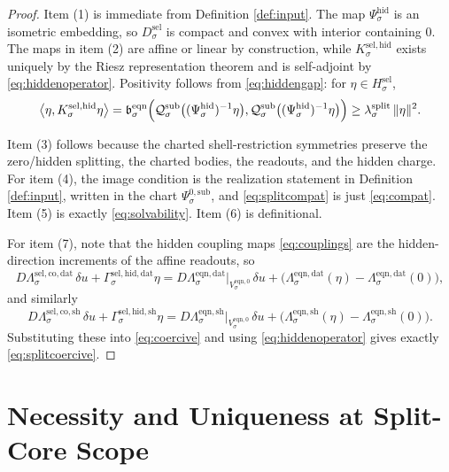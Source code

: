 \documentclass[11pt]{article}
\newcommand{\EqnZero}[1]{V_{#1}^{\mathrm{eqn},0}}
\newcommand{\EqnData}[1]{\Lambda_{#1}^{\mathrm{eqn,dat}}}
\newcommand{\EqnShell}[1]{\Lambda_{#1}^{\mathrm{eqn,sh}}}
\newcommand{\EqnPair}[1]{\mathfrak b_{#1}^{\mathrm{eqn}}}
\newcommand{\SubZeroChart}[1]{\Psi_{#1}^{0,\mathrm{sub}}}
\newcommand{\HiddenChart}[1]{\Psi_{#1}^{\mathrm{hid}}}
\newcommand{\SubCharge}[1]{\mathcal Q_{#1}^{\mathrm{sub}}}
\newcommand{\SelCoreData}[1]{\Lambda_{#1}^{\mathrm{sel,co,dat}}}
\newcommand{\SelCoreShell}[1]{\Lambda_{#1}^{\mathrm{sel,co,sh}}}
\newcommand{\GapSpace}[1]{H_{#1}^{\mathrm{sel}}}
\newcommand{\GapBody}[1]{D_{#1}^{\mathrm{sel}}}
\newcommand{\SelHiddenData}[1]{\Gamma_{#1}^{\mathrm{sel,hid,dat}}}
\newcommand{\SelHiddenShell}[1]{\Gamma_{#1}^{\mathrm{sel,hid,sh}}}
\newcommand{\HiddenOperator}[1]{K_{#1}^{\mathrm{sel,hid}}}
\begin{document}
\begin{proof}
Item (1) is immediate from Definition \ref{def:input}. The map \(\HiddenChart{\sigma}\) is an isometric embedding, so \(\GapBody{\sigma}\) is compact and convex with interior containing \(0\). The maps in item (2) are affine or linear by construction, while \(\HiddenOperator{\sigma}\) exists uniquely by the Riesz representation theorem and is self-adjoint by \eqref{eq:hiddenoperator}. Positivity follows from \eqref{eq:hiddengap}: for \(\eta\in\GapSpace{\sigma}\),
\[
\ev{\eta,\HiddenOperator{\sigma}\eta}
=
\EqnPair{\sigma}\Bigl(
\SubCharge{\sigma}\bigl((\HiddenChart{\sigma})^{-1}\eta\bigr),
\SubCharge{\sigma}\bigl((\HiddenChart{\sigma})^{-1}\eta\bigr)
\Bigr)
\ge
\lambda_{\sigma}^{\mathrm{split}}\,
\|\eta\|^{2}.
\]

Item (3) follows because the charted shell-restriction symmetries preserve the zero/hidden splitting, the charted bodies, the readouts, and the hidden charge. For item (4), the image condition is the realization statement in Definition \ref{def:input}, written in the chart \(\SubZeroChart{\sigma}\), and \eqref{eq:splitcompat} is just \eqref{eq:compat}. Item (5) is exactly \eqref{eq:solvability}. Item (6) is definitional.

For item (7), note that the hidden coupling maps \eqref{eq:couplings} are the hidden-direction increments of the affine readouts, so
\[
D\SelCoreData{\sigma}\,\delta u+\SelHiddenData{\sigma}\eta
=
D\EqnData{\sigma}\big|_{\EqnZero{\sigma}}\,\delta u
+
\bigl(\EqnData{\sigma}(\eta)-\EqnData{\sigma}(0)\bigr),
\]
and similarly
\[
D\SelCoreShell{\sigma}\,\delta u+\SelHiddenShell{\sigma}\eta
=
D\EqnShell{\sigma}\big|_{\EqnZero{\sigma}}\,\delta u
+
\bigl(\EqnShell{\sigma}(\eta)-\EqnShell{\sigma}(0)\bigr).
\]
Substituting these into \eqref{eq:coercive} and using \eqref{eq:hiddenoperator} gives exactly \eqref{eq:splitcoercive}.
\end{proof}

\section{Necessity and Uniqueness at Split-Core Scope}
\end{document}

